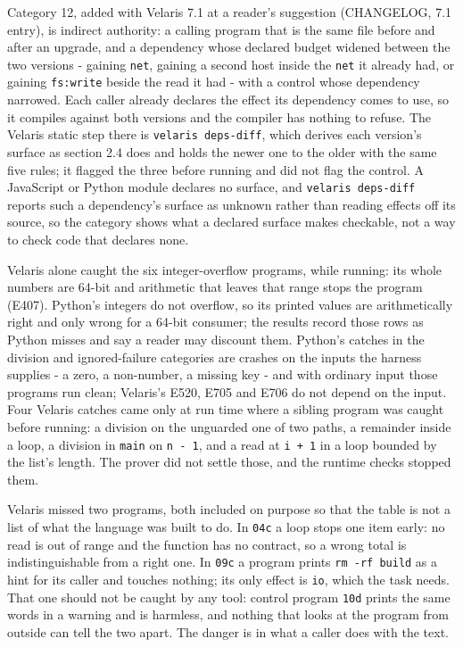 \documentclass[
]{article}
\newcounter{none} %
\begin{document}
Category 12, added with Velaris 7.1 at a reader's suggestion (CHANGELOG,
7.1 entry), is indirect authority: a calling program that is the same
file before and after an upgrade, and a dependency whose declared budget
widened between the two versions - gaining \texttt{net}, gaining a
second host inside the \texttt{net} it already had, or gaining
\texttt{fs:write} beside the read it had - with a control whose
dependency narrowed. Each caller already declares the effect its
dependency comes to use, so it compiles against both versions and the
compiler has nothing to refuse. The Velaris static step there is
\texttt{velaris\ deps-diff}, which derives each version's surface as
section 2.4 does and holds the newer one to the older with the same five
rules; it flagged the three before running and did not flag the control.
A JavaScript or Python module declares no surface, and
\texttt{velaris\ deps-diff} reports such a dependency's surface as
unknown rather than reading effects off its source, so the category
shows what a declared surface makes checkable, not a way to check code
that declares none.

Velaris alone caught the six integer-overflow programs, while running:
its whole numbers are 64-bit and arithmetic that leaves that range stops
the program (E407). Python's integers do not overflow, so its printed
values are arithmetically right and only wrong for a 64-bit consumer;
the results record those rows as Python misses and say a reader may
discount them. Python's catches in the division and ignored-failure
categories are crashes on the inputs the harness supplies - a zero, a
non-number, a missing key - and with ordinary input those programs run
clean; Velaris's E520, E705 and E706 do not depend on the input. Four
Velaris catches came only at run time where a sibling program was caught
before running: a division on the unguarded one of two paths, a
remainder inside a loop, a division in \texttt{main} on
\texttt{n\ -\ 1}, and a read at \texttt{i\ +\ 1} in a loop bounded by
the list's length. The prover did not settle those, and the runtime
checks stopped them.

Velaris missed two programs, both included on purpose so that the table
is not a list of what the language was built to do. In \texttt{04c} a
loop stops one item early: no read is out of range and the function has
no contract, so a wrong total is indistinguishable from a right one. In
\texttt{09c} a program prints \texttt{rm\ -rf\ build} as a hint for its
caller and touches nothing; its only effect is \texttt{io}, which the
task needs. That one should not be caught by any tool: control program
\texttt{10d} prints the same words in a warning and is harmless, and
nothing that looks at the program from outside can tell the two apart.
The danger is in what a caller does with the text.
\end{document}
